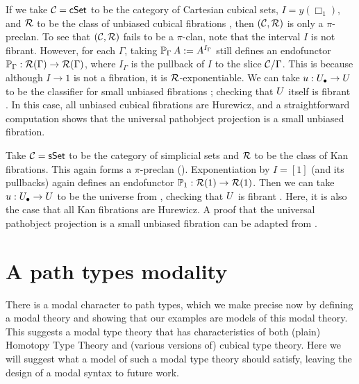 \begin{example} \label{example:cSet}
  If we take $\CC = \cSet$ to be the category of
  Cartesian cubical sets, $I = y(\Box_1)$,
  and $\RR$ to be the class of unbiased cubical fibrations
  \cite[Definition 4.6]{awodey2026cartesian},
  then $(\CC,\RR)$ is only a $\pi$-preclan.
  To see that $(\CC,\RR)$ fails to be a $\pi$-clan,
  note that the interval $I$ is not fibrant.
  However, for each $\Gamma$, taking $\arr[\Gamma] A := A^{I_\Gamma}$
  still defines an endofunctor $\arr[\Gamma] : \RR(\Gamma) \to \RR(\Gamma)$,
  where $I_\Gamma$ is the pullback of $I$ to the slice $\CC / \Gamma$.
  This is because although $I \to 1$ is not a fibration,
  it is $\RR$-exponentiable.
  We can take $\uu : \Ulow \to \U$
  to be the classifier for small unbiased fibrations
  \cite[Proposition 7.17]{awodey2026cartesian};
  checking that $\U$ itself is fibrant \cite[Proposition 9.4]{awodey2026cartesian}.
  In this case, all unbiased cubical fibrations are Hurewicz,
  and a straightforward computation shows that the universal pathobject projection
  is a small unbiased fibration.
\end{example}

\begin{example} \label{example:sSet}
  Take $\CC = \mathsf{sSet}$ to be the category of
  simplicial sets and $\RR$ to be the class of Kan fibrations.
  This again forms a $\pi$-preclan ().
  Exponentiation by $I = [1]$ (and its pullbacks)
  again defines an endofunctor $\arr[1] : \RR(1) \to \RR(1)$.
  Then we can take $\uu : \Ulow \to \U$
  to be the universe from \cite[Definition 2.1.9]{kapulkin2021},
  checking that $\U$ is fibrant \cite[Theorem 2.2.1]{kapulkin2021}.
  Here, it is also the case that all Kan fibrations are Hurewicz.
  A proof that the universal pathobject projection
  is a small unbiased fibration can be adapted from \cite[Proposition 2.3.3]{kapulkin2021}.
\end{example}

\section{A path types modality}
There is a modal character to path types, which we make precise now
by defining a modal theory and showing that our examples are models
of this modal theory.
This suggests a modal type theory that
has characteristics of both (plain) Homotopy Type Theory
and (various versions of) cubical type theory.
Here we will suggest what a model of such a modal type theory should satisfy,
leaving the design of a modal syntax to future work.

